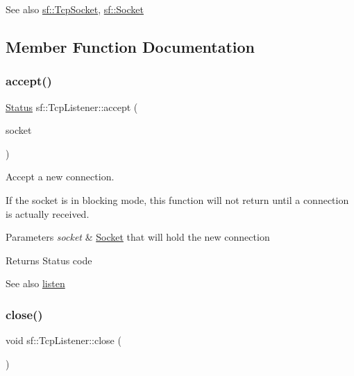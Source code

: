 \begin{DoxySeeAlso}{See also}
\hyperlink{classsf_1_1_tcp_socket}{sf\+::\+Tcp\+Socket}, \hyperlink{classsf_1_1_socket}{sf\+::\+Socket} 
\end{DoxySeeAlso}


\subsection{Member Function Documentation}
\mbox{\label{classsf_1_1_tcp_listener_ae2c83ce5a64d50b68180c46bef0a7346}} 
\subsubsection{\texorpdfstring{accept()}{accept()}}
{\footnotesize\ttfamily \hyperlink{classsf_1_1_socket_a51bf0fd51057b98a10fbb866246176dc}{Status} sf\+::\+Tcp\+Listener\+::accept (\begin{DoxyParamCaption}\item[{\hyperlink{classsf_1_1_tcp_socket}{Tcp\+Socket} \&}]{socket }\end{DoxyParamCaption})}



Accept a new connection. 

If the socket is in blocking mode, this function will not return until a connection is actually received.


\begin{DoxyParams}{Parameters}
{\em socket} & \hyperlink{classsf_1_1_socket}{Socket} that will hold the new connection\\
\hline
\end{DoxyParams}
\begin{DoxyReturn}{Returns}
Status code
\end{DoxyReturn}
\begin{DoxySeeAlso}{See also}
\hyperlink{classsf_1_1_tcp_listener_a9504758ea3570e62cb20b209c11776a1}{listen} 
\end{DoxySeeAlso}
\mbox{\label{classsf_1_1_tcp_listener_a3a00a850506bd0f9f48867a0fe59556b}} 
\subsubsection{\texorpdfstring{close()}{close()}}
{\footnotesize\ttfamily void sf\+::\+Tcp\+Listener\+::close (\begin{DoxyParamCaption}{ }\end{DoxyParamCaption})}



